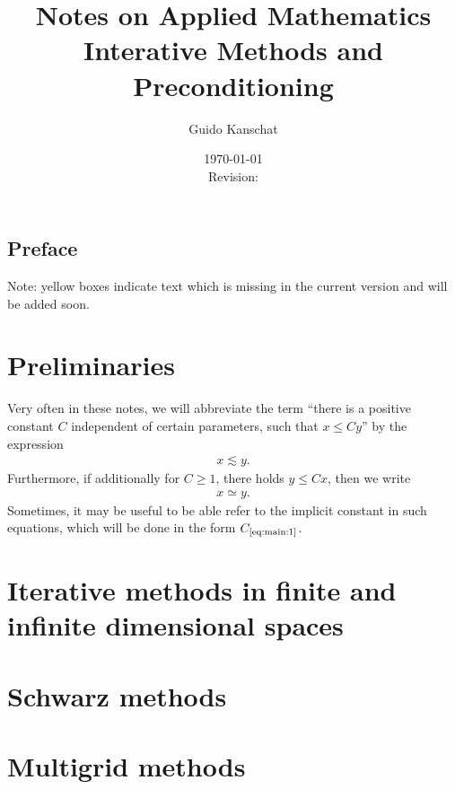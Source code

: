 \documentclass[USenglish,final]{report}
\title{\textbf{Notes on Applied Mathematics}
\\[5mm]
{\large Interative Methods and Preconditioning}}
\author{Guido Kanschat}
\date{\today\\[5mm]Revision: \svnrev}
\def\constref#1{C_{\text{\ref{#1}}}}
\begin{document}
\maketitle

\section*{Preface}

\thispagestyle{empty}
\begin{todo}
  Note: yellow boxes indicate text which is missing in the current
  version and will be added soon.
\end{todo}
\setcounter{page}{0}

\tableofcontents

\chapter{Preliminaries}

\begin{notation}
  Very often in these notes, we will abbreviate the term ``there is a
  positive constant $C$ independent of certain parameters, such that $x \le C
  y$'' by the expression
  \begin{gather}
    \label{eq:main:1}
    x \lesssim y.
  \end{gather}
  Furthermore, if additionally for $C\ge 1$, there holds  $y \le Cx$,
  then we write
  \begin{gather*}
    x \simeq y.
  \end{gather*}
  Sometimes, it may be useful to be able refer to the implicit
  constant in such equations, which will be done in the form  $\constref{eq:main:1}$.
\end{notation}



\chapter{Iterative methods in finite and infinite dimensional spaces}




\chapter{Schwarz methods}
\label{cha:iteration:schwarz-methods}


\chapter{Multigrid methods}
\label{cha:iteration:multigrid-methods}


\printbibliography
\printindex
\end{document}

